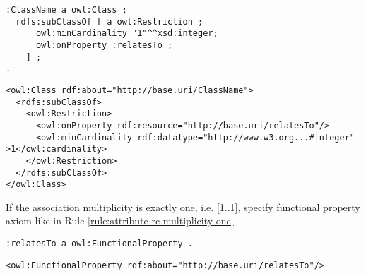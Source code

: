 \vspace{-\parskip}
\begin{minipage}[b]{.385\textwidth}
\begin{lstlisting}[language=Turtle, caption={Min cardinality restriction in Turtle syntax}, captionpos=b]
:ClassName a owl:Class ;
  rdfs:subClassOf [ a owl:Restriction ;
      owl:minCardinality "1"^^xsd:integer;
      owl:onProperty :relatesTo ;
    ] ;
.
\end{lstlisting}
\end{minipage}%
\quad\vspace{-\parskip}
\begin{minipage}[b]{.6\textwidth}
\begin{lstlisting}[language=RDF/XML, caption={Min cardinality restriction in RDF/XML syntax}, captionpos=b]
<owl:Class rdf:about="http://base.uri/ClassName">
  <rdfs:subClassOf>
    <owl:Restriction>
      <owl:onProperty rdf:resource="http://base.uri/relatesTo"/>
      <owl:minCardinality rdf:datatype="http://www.w3.org...#integer" >1</owl:cardinality>
    </owl:Restriction>
  </rdfs:subClassOf>
</owl:Class>
\end{lstlisting}
\end{minipage}
\vspace{-\parskip}

\begin{trule}
	\label{rule:association-uni-multiplicity-one-rc}
	If the association multiplicity is exactly one, i.e. [1..1], specify functional property axiom like in Rule \ref{rule:attribute-rc-multiplicity-one}.
\end{trule}

\vspace{-\parskip}
\begin{minipage}[b]{.45\textwidth}
\begin{lstlisting}[language=Turtle, caption={Declaring a functional property in Turtle syntax}, captionpos=b]
:relatesTo a owl:FunctionalProperty .
\end{lstlisting}
\end{minipage}%
\quad\vspace{-\parskip}
\begin{minipage}[b]{.55\textwidth}
\begin{lstlisting}[language=RDF/XML, caption={Declaring a functional property in RDF/XML syntax}, captionpos=b]
<owl:FunctionalProperty rdf:about="http://base.uri/relatesTo"/>
\end{lstlisting}
\end{minipage}
\vspace{-\parskip}

